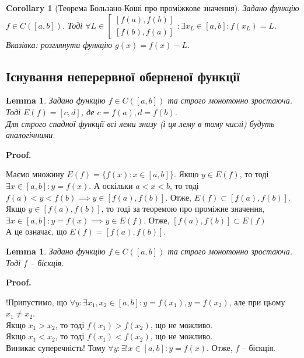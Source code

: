 \documentclass[a4paper, 14pt]{article}
\makeatletter
\def\qed{$\blacksquare$}
\theoremstyle{theoremdd}
\theoremstyle{theoremdd}
\theoremstyle{theoremdd}
\theoremstyle{theoremdd}
\theoremstyle{theoremdd}
\theoremstyle{theoremdd}
\theoremstyle{theoremdd}
\newtheorem{lemma}[theorem]{Lemma}
\theoremstyle{theoremdd}
\newtheorem{corollary}[theorem]{Corollary}
\renewenvironment{proof}[1][Proof.\\]{\par
\pushQED{\hfill \qed}%
\normalfont \topsep6\p@\@plus6\p@\relax
\trivlist
\item\relax
{\bfseries
#1\@addpunct{.}}\hspace\labelsep\ignorespaces
}{%
\popQED\endtrivlist\@endpefalse
}
\makeatother
\begin{document}
\begin{corollary}[Теорема Бользано-Коші про проміжкове значення]
Задано функцію $f \in C([a,b])$.
Тоді $\forall L \in \left[ \begin{gathered}  \left[f(a),f(b) \right] \\ \left[f(b),f(a) \right] \end{gathered} \right.: \exists x_L \in [a,b]: f(x_L) = L$.\\
\textit{Вказівка: розглянути функцію $g(x) = f(x) - L$.}
\end{corollary}

\subsection{Існування неперервної оберненої функції}
\begin{lemma}
Задано функцію $f \in C([a,b])$ та строго монотонно зростаюча. Тоді $E(f) = [c,d]$, де $c = f(a), d = f(b)$.\\
\textit{Для строго спадної функції всі леми знизу (і ця лему в тому числі) будуть аналогічними.}
\end{lemma}

\begin{proof}
Маємо множину $E(f) = \{f(x): x \in [a,b] \}$.
Якщо $y \in E(f)$, то тоді $\exists x \in [a,b]: y = f(x)$. А оскільки $a < x < b$, то тоді $f(a) < y < f(b) \implies y \in [f(a),f(b)]$. Отже, $E(f) \subset [f(a),f(b)]$.\\
Якщо $y \in [f(a),f(b)]$, то тоді за теоремою про проміжне значення, $\exists x \in [a,b]: y = f(x) \implies y \in E(f)$. Отже, $[f(a),f(b)] \subset E(f)$\\
А це означає, що $E(f) = [f(a),f(b)]$.
\end{proof}

\begin{lemma}
Задано функцію $f \in C([a,b])$ та строго монотонно зростаюча. Тоді $f$ -- бієкція.
\end{lemma}

\begin{proof}
!Припустимо, що $\forall y: \exists x_1,x_2 \in [a,b]: y = f(x_1), y = f(x_2)$, але при цьому $x_1 \neq x_2$.\\
Якщо $x_1 > x_2$, то тоді $f(x_1) > f(x_2)$, що не можливо.\\
Якщо $x_1 < x_2$, то тоді $f(x_1) < f(x_2)$, що не можливо.\\
Виникає суперечність! Тому $\forall y: \exists! x \in [a,b]: y = f(x)$. Отже, $f$ -- бієкція.
\end{proof}
\end{document}
